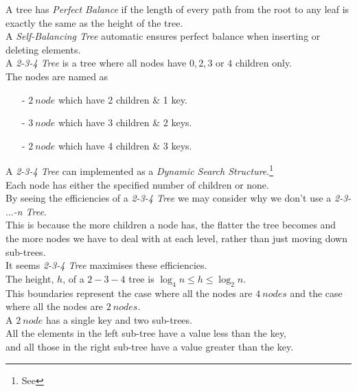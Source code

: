 \documentclass[11pt,a4paper]{article}
\begin{document}
A tree has \textit{Perfect Balance} if the length of every path from the root to any leaf is exactly the same as the height of the tree.\\

A \textit{Self-Balancing Tree} automatic ensures perfect balance when inserting or deleting elements.\\

\newpage
{}
A \textit{2-3-4 Tree} is a tree where all nodes have $0, 2, 3$ or $4$ children only.\\
The nodes are named as
\begin{itemize}
  \item[-] $2\ node$ which have 2 children \& 1 key.
  \item[-] $3\ node$ which have 3 children \& 2 keys.
  \item[-] $2\ node$ which have 4 children \& 3 keys.
\end{itemize}
A \textit{2-3-4 Tree} can implemented as a \textit{Dynamic Search Structure}.\footnote{See }\\
\nb Each node has either the specified number of children or none.\\

By seeing the efficiencies of a \textit{2-3-4 Tree} we may consider why we don't use a \textit{2-3-$\dots$-n Tree}.\\
This is because the more children a node has, the flatter the tree becomes and the more nodes we have to deal with at each level, rather than just moving down sub-trees.\\
It seems \textit{2-3-4 Tree} maximises these efficiencies.\\

The height, $h$, of a $2-3-4$ tree is $\log_4n\leq h\leq\log_2n$.\\
This boundaries represent the case where all the nodes are $4\ nodes$ and the case where all the nodes are $2\ nodes$.\\

A $2\ node$ has a single key and two sub-trees.\\
All the elements in the left sub-tree have a value less than the key,\\
and all those in the right sub-tree have a value greater than the key.\\
\end{document}
